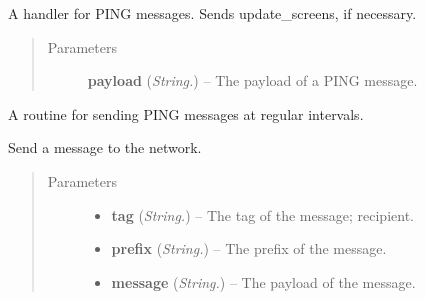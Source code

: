 \documentclass[letterpaper,10pt,english]{sphinxmanual}
\begin{document}
\begin{fulllineitems}

\begin{fulllineitems}
\label{api:swnp.SWNP.ping_handler}
A handler for PING messages. Sends update\_screens, if necessary.
\begin{quote}\begin{description}
\item[{Parameters}] \leavevmode
\textbf{payload} (\emph{String.}) -- The payload of a PING message.

\end{description}\end{quote}

\end{fulllineitems}


\begin{fulllineitems}
\label{api:swnp.SWNP.ping_routine}
A routine for sending PING messages at regular intervals.

\end{fulllineitems}


\begin{fulllineitems}
\label{api:swnp.SWNP.send}
Send a message to the network.
\begin{quote}\begin{description}
\item[{Parameters}] \leavevmode\begin{itemize}
\item {} 
\textbf{tag} (\emph{String.}) -- The tag of the message; recipient.

\item {} 
\textbf{prefix} (\emph{String.}) -- The prefix of the message.

\item {} 
\textbf{message} (\emph{String.}) -- The payload of the message.

\end{itemize}

\end{description}\end{quote}

\end{fulllineitems}


\end{fulllineitems}
\end{document}
